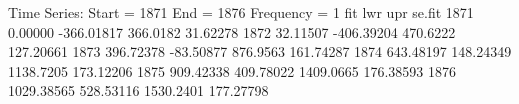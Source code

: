 \begin{Schunk}
\begin{Soutput}
Time Series:
Start = 1871 
End = 1876 
Frequency = 1 
            fit        lwr       upr    se.fit
1871    0.00000 -366.01817  366.0182  31.62278
1872   32.11507 -406.39204  470.6222 127.20661
1873  396.72378  -83.50877  876.9563 161.74287
1874  643.48197  148.24349 1138.7205 173.12206
1875  909.42338  409.78022 1409.0665 176.38593
1876 1029.38565  528.53116 1530.2401 177.27798
\end{Soutput}
\end{Schunk}
